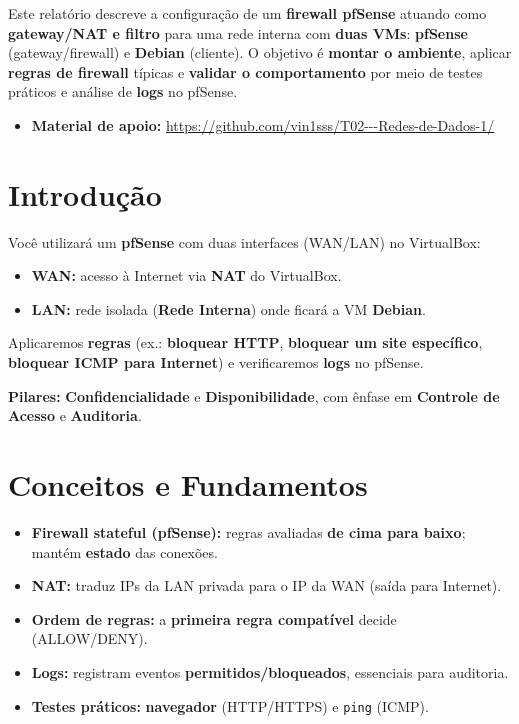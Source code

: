 ﻿




\noindent
Este relatório descreve a configuração de um \textbf{firewall pfSense} atuando como \textbf{gateway/NAT e filtro} para uma rede interna com \textbf{duas VMs}: \textbf{pfSense} (gateway/firewall) e \textbf{Debian} (cliente). O objetivo é \textbf{montar o ambiente}, aplicar \textbf{regras de firewall} típicas e \textbf{validar o comportamento} por meio de testes práticos e análise de \textbf{logs} no pfSense.

\begin{itemize}
  \item \textbf{Material de apoio:} \url{https://github.com/vin1sss/T02---Redes-de-Dados-1/}
\end{itemize}

\section{Introdução}

Você utilizará um \textbf{pfSense} com duas interfaces (WAN/LAN) no VirtualBox:
\begin{itemize}
  \item \textbf{WAN:} acesso à Internet via \textbf{NAT} do VirtualBox.
  \item \textbf{LAN:} rede isolada (\textbf{Rede Interna}) onde ficará a VM \textbf{Debian}.
\end{itemize}

Aplicaremos \textbf{regras} (ex.: \textbf{bloquear HTTP}, \textbf{bloquear um site específico}, \textbf{bloquear ICMP para Internet}) e verificaremos \textbf{logs} no pfSense.

\textbf{Pilares:} \textbf{Confidencialidade} e \textbf{Disponibilidade}, com ênfase em \textbf{Controle de Acesso} e \textbf{Auditoria}.

\section{Conceitos e Fundamentos}

\begin{itemize}
  \item \textbf{Firewall stateful (pfSense):} regras avaliadas \textbf{de cima para baixo}; mantém \textbf{estado} das conexões.
  \item \textbf{NAT:} traduz IPs da LAN privada para o IP da WAN (saída para Internet).
  \item \textbf{Ordem de regras:} a \textbf{primeira regra compatível} decide (ALLOW/DENY).
  \item \textbf{Logs:} registram eventos \textbf{permitidos/bloqueados}, essenciais para auditoria.
  \item \textbf{Testes práticos:} \textbf{navegador} (HTTP/HTTPS) e \texttt{ping} (ICMP).
\end{itemize}

